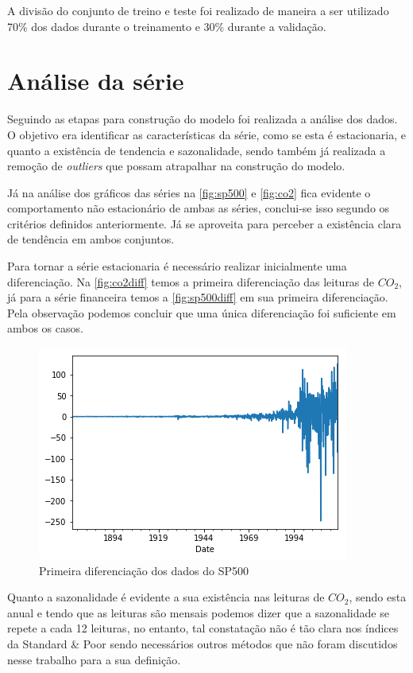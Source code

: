 \documentclass[
    12pt,
    oneside,
    a4paper,
    english,
    brazil
]{abntex2}
\begin{document}
A divisão do conjunto de treino e teste foi realizado de maneira a ser
utilizado 70\% dos dados durante o treinamento e 30\% durante a validação.

\section{Análise da série}

Seguindo as etapas para construção do modelo foi realizada a análise dos dados.
O  objetivo  era identificar  as  características  da  série,  como se  esta  é
estacionaria, e quanto  a existência de tendencia e  sazonalidade, sendo também
já realizada a remoção de \textit{outliers} que possam atrapalhar na construção
do modelo.

Já   na   análise   dos   gráficos  das   séries   na   \autoref{fig:sp500}   e
\autoref{fig:co2} fica  evidente o comportamento  não estacionário de  ambas as
séries, conclui-se  isso segundo  os critérios  definidos anteriormente.  Já se
aproveita para perceber a existência clara de tendência em ambos conjuntos.

Para  tornar  a  série  estacionaria é  necessário  realizar  inicialmente  uma
diferenciação.  Na \autoref{fig:co2diff}  temos  a  primeira diferenciação  das
leituras de $CO_2$, já para  a série financeira temos a \autoref{fig:sp500diff}
em sua primeira  diferenciação. Pela observação podemos concluir  que uma única
diferenciação foi suficiente em ambos os casos.

\begin{figure}[ht]
    \centering
    \caption{Primeira diferenciação dos dados do SP500}\label{fig:sp500diff}
    \includegraphics[width=.5\linewidth]{images/sp500diff.png}
\end{figure}

Quanto a sazonalidade é evidente a sua existência nas leituras de $CO_2$, sendo
esta anual e tendo que as leituras são mensais podemos dizer que a sazonalidade
se repete a cada  12 leituras, no entanto, tal constatação não  é tão clara nos
índices da  Standard \&  Poor sendo  necessários outros  métodos que  não foram
discutidos nesse trabalho para a sua definição.
\end{document}
